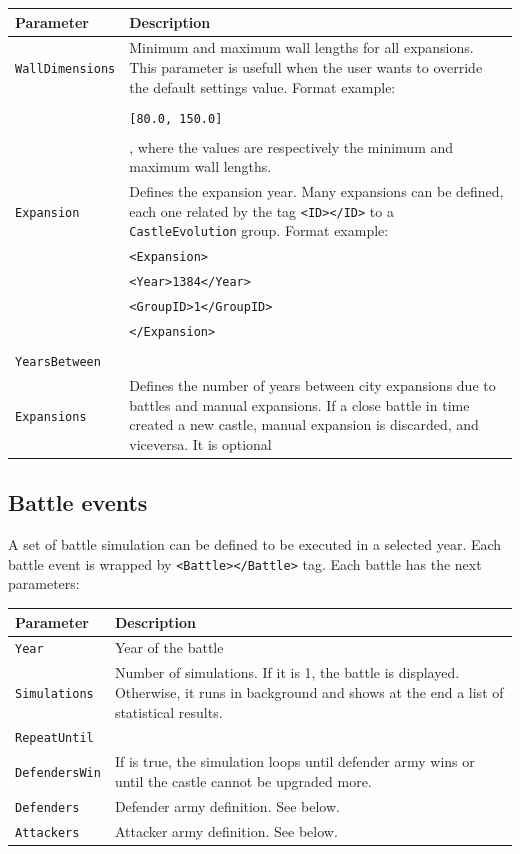 \documentclass[tog]{acmsiggraph}
\begin{document}
\begin{tabularx}{0.48\textwidth}{ |l|X| }
\hline 
\textbf{Parameter} & \textbf{Description} \\[0.15cm]
 \hline
   \texttt{WallDimensions} & Minimum and maximum wall lengths for all expansions. This parameter is usefull when the user wants to override the default settings value. Format example: \\
   & \\
   & \quad\texttt{[80.0, 150.0]} \\
   & \\
   & , where the values are respectively the minimum and maximum wall lengths.\\
 \hline
   \texttt{Expansion} & Defines the expansion year. Many expansions can be defined, each one related by the tag \texttt{<ID></ID>} to a \texttt{CastleEvolution} group. Format example:\\
 & \quad\texttt{<Expansion>}\\
 & \quad\quad\texttt{<Year>1384</Year>}\\
 & \quad\quad\texttt{<GroupID>1</GroupID>}\\
 & \quad\texttt{</Expansion>}\\
 & \\
 \hline
 \texttt{YearsBetween} & \\
 \texttt{Expansions} & Defines the number of years between city expansions due to battles and manual expansions. 
 If a close battle in time created a new castle, manual expansion is discarded, and viceversa. It is optional\\
\hline
\end{tabularx} 
 
 
 
\subsection{Battle events}
\label{sec:battleevents}

A set of battle simulation can be defined to be executed in a selected year.
Each battle event is wrapped by \texttt{<Battle></Battle>} tag. 
Each battle has the next parameters:

\begin{tabularx}{0.48\textwidth}{ |l|X| }
\hline 
\textbf{Parameter} & \textbf{Description} \\[0.15cm]
 \hline
 \texttt{Year} & Year of the battle \\
 \hline
 \texttt{Simulations} & Number of simulations. If it is 1, the battle is displayed. Otherwise, it runs in background and shows at the end a list of statistical results. \\
 \hline
 \texttt{RepeatUntil} & \\
 \texttt{DefendersWin} & If is true, the simulation loops until defender army wins or until the castle cannot be upgraded more.\\
 \hline
 \texttt{Defenders} & Defender army definition. See below.\\
 \hline
 \texttt{Attackers} & Attacker army definition. See below.\\
 \hline
\end{tabularx} 
\end{document}
